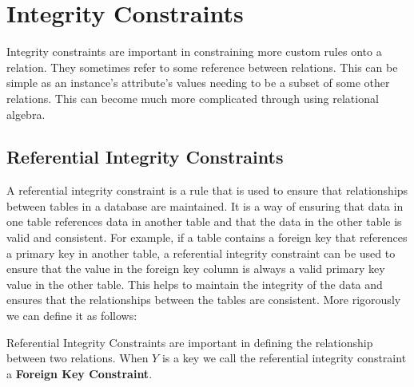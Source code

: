 \documentclass{report}
\begin{document}
\newpage



     \section{Integrity Constraints}
     \par Integrity constraints are important in constraining more custom rules onto a relation. They sometimes refer to some reference between relations. This can be simple as an instance's attribute's values needing to be a subset of some other relations. This can become much more complicated through using relational algebra.

     \subsection{Referential Integrity Constraints}
     \hspace{.5cm} A referential integrity constraint is a rule that is used to ensure that relationships between tables in a database are maintained. It is a way of ensuring that data in one table references data in another table and that the data in the other table is valid and consistent. For example, if a table contains a foreign key that references a primary key in another table, a referential integrity constraint can be used to ensure that the value in the foreign key column is always a valid primary key value in the other table. This helps to maintain the integrity of the data and ensures that the relationships between the tables are consistent. More rigorously we can define it as follows:
\vspace{.5cm}
 
     
     \vspace{.5cm}
      
      \par Referential Integrity Constraints are important in defining the relationship between two relations. When $Y$ is a key we call the referential integrity constraint a \textbf{Foreign Key Constraint}. 
\end{document}
